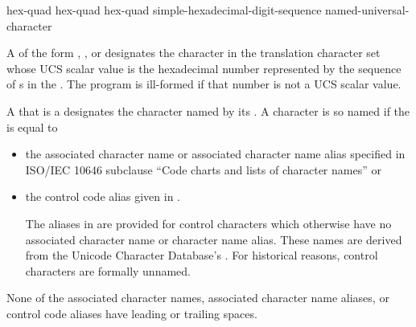 \begin{bnf}
\br
     hex-quad\br
     hex-quad hex-quad\br
     simple-hexadecimal-digit-sequence \terminal{\}}\br
    named-universal-character
\end{bnf}

\pnum
A 
of the form  ,
  , or
designates the character in the translation character set
whose UCS scalar value is the hexadecimal number represented by
the sequence of s
in the .
The program is ill-formed if that number is not a UCS scalar value.

\pnum
A 
that is a 
designates the character named by its .
A character is so named if the  is equal to
\begin{itemize}
\item
the associated character name or associated character name alias
specified in ISO/IEC 10646 subclause ``Code charts and lists of character names''
or
\item
the control code alias given in .
\begin{note}
The aliases in  are provided for control characters
which otherwise have no associated character name or character name alias.
These names are derived from
the Unicode Character Database's .
For historical reasons, control characters are formally unnamed.
\end{note}
\end{itemize}
\begin{note}
None of the associated character names,
associated character name aliases, or
control code aliases
have leading or trailing spaces.
\end{note}

